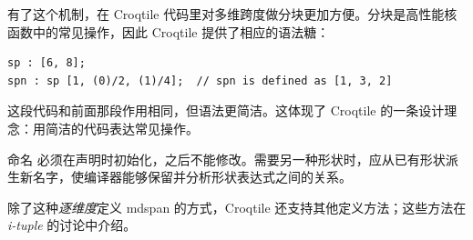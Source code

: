 有了这个机制，在 Croqtile 代码里对多维跨度做分块更加方便。分块是高性能核函数中的常见操作，因此 Croqtile 提供了相应的语法糖：

\begin{lstlisting}[language=croqtile,caption={同样的形状，另一种写法}]
sp : [6, 8];
spn : sp [1, (0)/2, (1)/4];  // spn is defined as [1, 3, 2]
\end{lstlisting}

这段代码和前面那段作用相同，但语法更简洁。这体现了 Croqtile 的一条设计理念：用简洁的代码表达常见操作。

命名 \co@mdspan@ 必须在声明时初始化，之后不能修改。需要另一种形状时，应从已有形状派生新名字，使编译器能够保留并分析形状表达式之间的关系。

除了这种\emph{逐维度}定义 mdspan 的方式，Croqtile 还支持其他定义方法；这些方法在 \emph{i-tuple} 的讨论中介绍。
